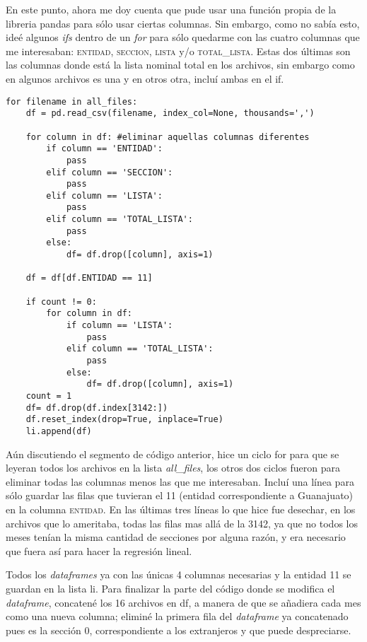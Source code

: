 \documentclass{article}
\begin{document}
En este punto, ahora me doy cuenta que pude usar una función propia de la libreria pandas para sólo usar ciertas columnas. Sin embargo, como no sabía esto, ideé algunos \textit{ifs} dentro de un \textit{for} para sólo quedarme con las cuatro columnas que me interesaban: \textsc{entidad}, \textsc{seccion}, \textsc{lista} y/o \textsc{total\_lista}. Estas dos últimas son las columnas donde está la lista nominal total en los archivos, sin embargo como en algunos archivos es una y en otros otra, incluí ambas en el if.

\begin{lstlisting}
for filename in all_files:
    df = pd.read_csv(filename, index_col=None, thousands=',')
    
    for column in df: #eliminar aquellas columnas diferentes
        if column == 'ENTIDAD':
            pass
        elif column == 'SECCION':
            pass
        elif column == 'LISTA':
            pass
        elif column == 'TOTAL_LISTA':
            pass
        else:
            df= df.drop([column], axis=1)
        
    df = df[df.ENTIDAD == 11]
    
    if count != 0:
        for column in df: 
            if column == 'LISTA':
                pass
            elif column == 'TOTAL_LISTA':
                pass
            else:
                df= df.drop([column], axis=1)
    count = 1
    df= df.drop(df.index[3142:])
    df.reset_index(drop=True, inplace=True)
    li.append(df)
\end{lstlisting}
    
Aún discutiendo el segmento de código anterior, hice un ciclo for para que se leyeran todos los archivos en la lista \textit{all\_files}, los otros dos ciclos fueron para eliminar todas las columnas menos las que me interesaban. Incluí una línea para sólo guardar las filas que tuvieran el 11 (entidad correspondiente a Guanajuato) en la columna \textsc{entidad}. En las últimas tres líneas lo que hice fue desechar, en los archivos que lo ameritaba, todas las filas mas allá de la 3142, ya que no todos los meses tenían la misma cantidad de secciones por alguna razón, y era necesario que fuera así para hacer la regresión lineal.

Todos los \textit{dataframes} ya con las únicas 4 columnas necesarias y la entidad 11 se guardan en la lista li. Para finalizar la parte del código donde se modifica el \textit{dataframe}, concatené los 16 archivos en df, a manera de que se añadiera cada mes como una nueva columna; eliminé la primera fila del \textit{dataframe} ya concatenado pues es la sección  0, correspondiente a los extranjeros y que puede despreciarse.
\end{document}
